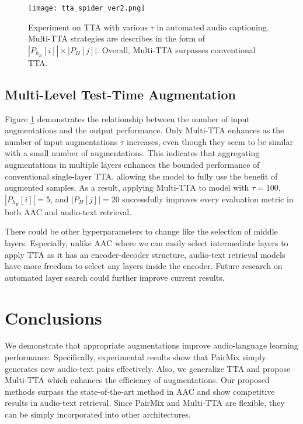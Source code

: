 \documentclass{INTERSPEECH2023}
\begin{document}
\begin{figure}
  \centering
  \texttt{[image: tta\_spider\_ver2.png]}
  \caption{Experiment on TTA with various $\tau$ in automated audio captioning. Multi-TTA strategies are describes in the form of $|P_{h_E}[i]|\times|P_H[j]|$. Overall, Multi-TTA surpasses conventional TTA.}
  \label{fig:test2}
\end{figure}


\subsection{Multi-Level Test-Time Augmentation}
Figure \ref{fig:test2} demonstrates the relationship between the number of input augmentations and the output performance. Only Multi-TTA enhances as the number of input augmentations $\tau$ increases, even though they seem to be similar with a small number of augmentations. This indicates that aggregating augmentations in multiple layers enhances the bounded performance of conventional single-layer TTA, allowing the model to fully use the benefit of augmented samples. As a result, applying Multi-TTA to model with $\tau=100$, $|P_{h_E}[i]|=5$, and $|P_H[j]|=20$ successfully improves every evaluation metric in both AAC and audio-text retrieval.

There could be other hyperparameters to change like the selection of middle layers. Especially, unlike AAC where we can easily select intermediate layers to apply TTA as it has an encoder-decoder structure, audio-text retrieval models have more freedom to select any layers inside the encoder. Future research on automated layer search could further improve current results. 


\section{Conclusions}
\label{sec:subhead}

We demonstrate that appropriate augmentations improve audio-language learning performance. Specifically, experimental results show that PairMix simply generates new audio-text pairs effectively. Also, we generalize TTA and propose Multi-TTA which enhances the efficiency of augmentations. Our proposed methods surpass the state-of-the-art method in AAC and show competitive results in audio-text retrieval. Since PairMix and Multi-TTA are flexible, they can be simply incorporated into other architectures.




\end{document}
